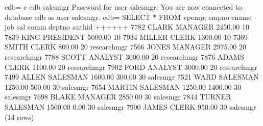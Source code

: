 \documentclass[letterpaper,10pt,english,openany,oneside]{sphinxmanual}
\begin{document}
%
\begin{sphinxVerbatim}[commandchars=\\\{\}]
edb=\PYGZsh{} \PYGZbs{}c edb salesmgr
Password for user salesmgr:
You are now connected to database \PYGZdq{}edb\PYGZdq{} as user \PYGZdq{}salesmgr\PYGZdq{}.
edb=\PYGZgt{} SELECT * FROM vpemp;
 empno \textbar{} ename  \textbar{}    job    \textbar{}   sal   \textbar{}  comm   \textbar{} deptno \textbar{}   authid
\PYGZhy{}\PYGZhy{}\PYGZhy{}\PYGZhy{}\PYGZhy{}\PYGZhy{}\PYGZhy{}+\PYGZhy{}\PYGZhy{}\PYGZhy{}\PYGZhy{}\PYGZhy{}\PYGZhy{}\PYGZhy{}\PYGZhy{}+\PYGZhy{}\PYGZhy{}\PYGZhy{}\PYGZhy{}\PYGZhy{}\PYGZhy{}\PYGZhy{}\PYGZhy{}\PYGZhy{}\PYGZhy{}\PYGZhy{}+\PYGZhy{}\PYGZhy{}\PYGZhy{}\PYGZhy{}\PYGZhy{}\PYGZhy{}\PYGZhy{}\PYGZhy{}\PYGZhy{}+\PYGZhy{}\PYGZhy{}\PYGZhy{}\PYGZhy{}\PYGZhy{}\PYGZhy{}\PYGZhy{}\PYGZhy{}\PYGZhy{}+\PYGZhy{}\PYGZhy{}\PYGZhy{}\PYGZhy{}\PYGZhy{}\PYGZhy{}\PYGZhy{}\PYGZhy{}+\PYGZhy{}\PYGZhy{}\PYGZhy{}\PYGZhy{}\PYGZhy{}\PYGZhy{}\PYGZhy{}\PYGZhy{}\PYGZhy{}\PYGZhy{}\PYGZhy{}\PYGZhy{}\PYGZhy{}
  7782 \textbar{} CLARK  \textbar{} MANAGER   \textbar{} 2450.00 \textbar{}         \textbar{}     10 \textbar{}
  7839 \textbar{} KING   \textbar{} PRESIDENT \textbar{} 5000.00 \textbar{}         \textbar{}     10 \textbar{}
  7934 \textbar{} MILLER \textbar{} CLERK     \textbar{} 1300.00 \textbar{}         \textbar{}     10 \textbar{}
  7369 \textbar{} SMITH  \textbar{} CLERK     \textbar{}  800.00 \textbar{}         \textbar{}     20 \textbar{} researchmgr
  7566 \textbar{} JONES  \textbar{} MANAGER   \textbar{} 2975.00 \textbar{}         \textbar{}     20 \textbar{} researchmgr
  7788 \textbar{} SCOTT  \textbar{} ANALYST   \textbar{} 3000.00 \textbar{}         \textbar{}     20 \textbar{} researchmgr
  7876 \textbar{} ADAMS  \textbar{} CLERK     \textbar{} 1100.00 \textbar{}         \textbar{}     20 \textbar{} researchmgr
  7902 \textbar{} FORD   \textbar{} ANALYST   \textbar{} 3000.00 \textbar{}         \textbar{}     20 \textbar{} researchmgr
  7499 \textbar{} ALLEN  \textbar{} SALESMAN  \textbar{} 1600.00 \textbar{}  300.00 \textbar{}     30 \textbar{} salesmgr
  7521 \textbar{} WARD   \textbar{} SALESMAN  \textbar{} 1250.00 \textbar{}  500.00 \textbar{}     30 \textbar{} salesmgr
  7654 \textbar{} MARTIN \textbar{} SALESMAN  \textbar{} 1250.00 \textbar{} 1400.00 \textbar{}     30 \textbar{} salesmgr
  7698 \textbar{} BLAKE  \textbar{} MANAGER   \textbar{} 2850.00 \textbar{}         \textbar{}     30 \textbar{} salesmgr
  7844 \textbar{} TURNER \textbar{} SALESMAN  \textbar{} 1500.00 \textbar{}    0.00 \textbar{}     30 \textbar{} salesmgr
  7900 \textbar{} JAMES  \textbar{} CLERK     \textbar{}  950.00 \textbar{}         \textbar{}     30 \textbar{} salesmgr
(14 rows)
\end{sphinxVerbatim}
\end{document}
